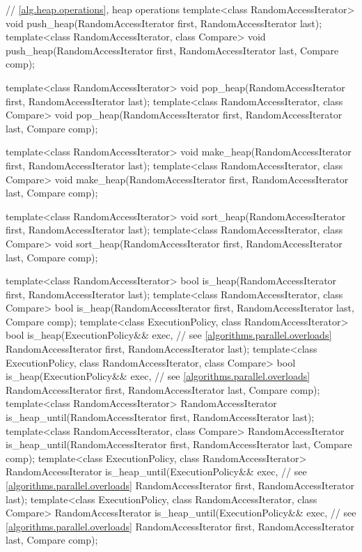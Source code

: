 \begin{codeblock}
{  // \ref{alg.heap.operations}, heap operations
  template<class RandomAccessIterator>
    void push_heap(RandomAccessIterator first, RandomAccessIterator last);
  template<class RandomAccessIterator, class Compare>
    void push_heap(RandomAccessIterator first, RandomAccessIterator last,
                   Compare comp);

  template<class RandomAccessIterator>
    void pop_heap(RandomAccessIterator first, RandomAccessIterator last);
  template<class RandomAccessIterator, class Compare>
    void pop_heap(RandomAccessIterator first, RandomAccessIterator last,
                  Compare comp);

  template<class RandomAccessIterator>
    void make_heap(RandomAccessIterator first, RandomAccessIterator last);
  template<class RandomAccessIterator, class Compare>
    void make_heap(RandomAccessIterator first, RandomAccessIterator last,
                   Compare comp);

  template<class RandomAccessIterator>
    void sort_heap(RandomAccessIterator first, RandomAccessIterator last);
  template<class RandomAccessIterator, class Compare>
    void sort_heap(RandomAccessIterator first, RandomAccessIterator last,
                   Compare comp);

  template<class RandomAccessIterator>
    bool is_heap(RandomAccessIterator first, RandomAccessIterator last);
  template<class RandomAccessIterator, class Compare>
    bool is_heap(RandomAccessIterator first, RandomAccessIterator last, Compare comp);
  template<class ExecutionPolicy, class RandomAccessIterator>
    bool is_heap(ExecutionPolicy&& exec, // see \ref{algorithms.parallel.overloads}
                 RandomAccessIterator first, RandomAccessIterator last);
  template<class ExecutionPolicy, class RandomAccessIterator, class Compare>
    bool is_heap(ExecutionPolicy&& exec, // see \ref{algorithms.parallel.overloads}
                 RandomAccessIterator first, RandomAccessIterator last, Compare comp);
  template<class RandomAccessIterator>
    RandomAccessIterator is_heap_until(RandomAccessIterator first, RandomAccessIterator last);
  template<class RandomAccessIterator, class Compare>
    RandomAccessIterator is_heap_until(RandomAccessIterator first, RandomAccessIterator last,
                                       Compare comp);
  template<class ExecutionPolicy, class RandomAccessIterator>
    RandomAccessIterator is_heap_until(ExecutionPolicy&& exec, // see \ref{algorithms.parallel.overloads}
                                       RandomAccessIterator first, RandomAccessIterator last);
  template<class ExecutionPolicy, class RandomAccessIterator, class Compare>
    RandomAccessIterator is_heap_until(ExecutionPolicy&& exec, // see \ref{algorithms.parallel.overloads}
                                       RandomAccessIterator first, RandomAccessIterator last,
                                       Compare comp);

}
\end{codeblock}
